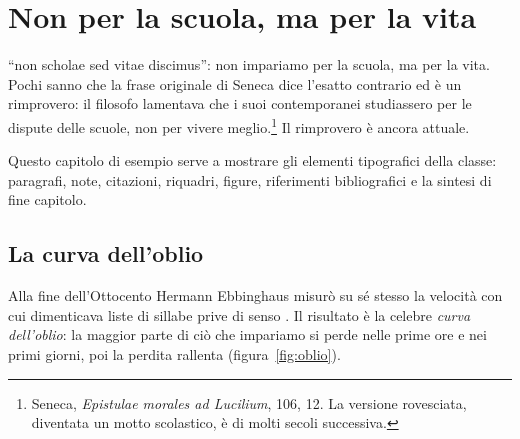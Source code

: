\chapter{Non per la scuola, ma per la vita}
\label{cap:vita}


 \enquote{non scholae sed vitae discimus}:
non impariamo per la scuola, ma per la vita. Pochi sanno che la frase
originale di Seneca dice l'esatto contrario ed è un rimprovero: il
filosofo lamentava che i suoi contemporanei studiassero per le
dispute delle scuole, non per vivere meglio.\footnote{Seneca,
\emph{Epistulae morales ad Lucilium}, 106, 12. La versione rovesciata,
diventata un motto scolastico, è di molti secoli successiva.} Il
rimprovero è ancora attuale.

Questo capitolo di esempio serve a mostrare gli elementi tipografici
della classe: paragrafi, note, citazioni, riquadri, figure,
riferimenti bibliografici e la sintesi di fine capitolo.

\section{La curva dell'oblio}

Alla fine dell'Ottocento Hermann Ebbinghaus misurò su sé stesso la
velocità con cui dimenticava liste di sillabe prive di senso
\parencite{ebbinghaus1885}. Il risultato è la celebre \emph{curva
dell'oblio}: la maggior parte di ciò che impariamo si perde nelle prime
ore e nei primi giorni, poi la perdita rallenta
(figura~\ref{fig:oblio}).

